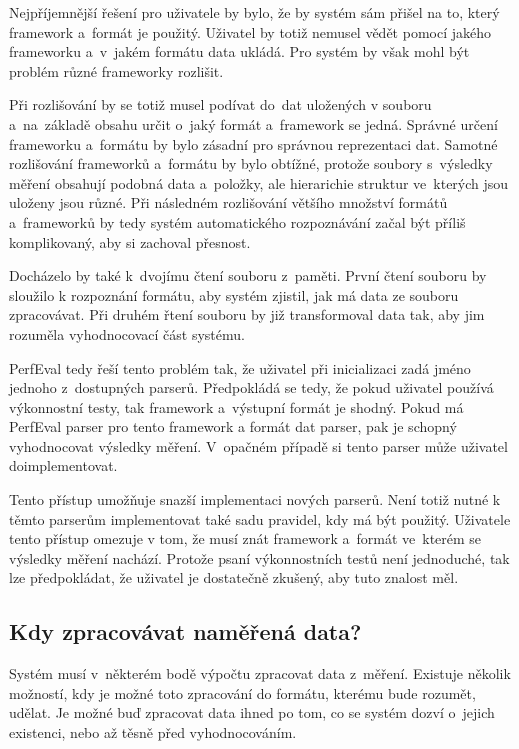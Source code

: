 Nejpříjemnější řešení pro uživatele by bylo, že by systém sám přišel na to, který framework a~formát je použitý.
Uživatel by totiž nemusel vědět pomocí jakého frameworku a~v~jakém formátu data ukládá. Pro systém by však mohl
být problém různé frameworky rozlišit.

Při rozlišování by se totiž musel podívat do~dat uložených v souboru
a~na~základě obsahu určit o~jaký formát a~framework se jedná. Správné určení frameworku a~formátu by bylo zásadní pro
správnou reprezentaci dat. Samotné rozlišování frameworků a~formátu by bylo obtížné, protože soubory s~výsledky
měření obsahují podobná data a~položky, ale hierarichie struktur ve~kterých jsou uloženy jsou různé.
Při následném rozlišování většího množství formátů a~frameworků by tedy systém automatického rozpoznávání
začal být příliš komplikovaný, aby si zachoval přesnost.

Docházelo by také k~dvojímu čtení souboru z~paměti. První čtení souboru by sloužilo k rozpoznání formátu,
aby systém zjistil, jak má data ze souboru zpracovávat. Při druhém řtení souboru by již transformoval data
tak, aby jim rozuměla vyhodnocovací část systému.

PerfEval tedy řeší tento problém tak, že uživatel při inicializaci zadá jméno jednoho z~dostupných parserů.
Předpokládá se tedy, že pokud uživatel používá výkonnostní testy, tak framework a~výstupní formát je shodný.
Pokud má PerfEval parser pro tento framework a formát dat parser, pak je schopný vyhodnocovat výsledky měření.
V~opačném případě si tento parser může uživatel doimplementovat.

Tento přístup umožňuje snazší implementaci nových parserů. Není totiž nutné k těmto parserům implementovat
také sadu pravidel, kdy má být použitý. Uživatele tento přístup omezuje v tom, že musí znát framework a~formát
ve~kterém se výsledky měření nachází. Protože psaní výkonnostních testů není jednoduché, tak lze předpokládat,
že uživatel je dostatečně zkušený, aby tuto znalost měl.

\subsection{Kdy zpracovávat naměřená data?}

Systém musí v~některém bodě výpočtu zpracovat data z~měření. Existuje několik možností, kdy
je možné toto zpracování do formátu, kterému bude rozumět, udělat. Je možné buď zpracovat
data ihned po tom, co se systém dozví o~jejich existenci, nebo až těsně před vyhodnocováním.

